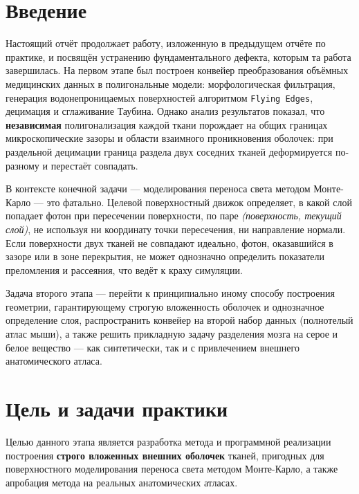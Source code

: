 \documentclass[a4paper,14pt]{article}
\begin{document}

\newpage

\tableofcontents
\newpage

\section{Введение}
Настоящий отчёт продолжает работу, изложенную в предыдущем отчёте по практике, и посвящён устранению фундаментального дефекта, которым та работа завершилась. На первом этапе был построен конвейер преобразования объёмных медицинских данных в полигональные модели: морфологическая фильтрация, генерация водонепроницаемых поверхностей алгоритмом \texttt{Flying Edges}, децимация и сглаживание Таубина. Однако анализ результатов показал, что \textbf{независимая} полигонализация каждой ткани порождает на общих границах микроскопические зазоры и области взаимного проникновения оболочек: при раздельной децимации граница раздела двух соседних тканей деформируется по-разному и перестаёт совпадать.

В контексте конечной задачи --- моделирования переноса света методом Монте-Карло \cite{wang1995} --- это фатально. Целевой поверхностный движок определяет, в какой слой попадает фотон при пересечении поверхности, по паре \emph{(поверхность, текущий слой)}, не используя ни координату точки пересечения, ни направление нормали. Если поверхности двух тканей не совпадают идеально, фотон, оказавшийся в зазоре или в зоне перекрытия, не может однозначно определить показатели преломления и рассеяния, что ведёт к краху симуляции.

Задача второго этапа --- перейти к принципиально иному способу построения геометрии, гарантирующему строгую вложенность оболочек и однозначное определение слоя, распространить конвейер на второй набор данных (полнотелый атлас мыши), а также решить прикладную задачу разделения мозга на серое и белое вещество --- как синтетически, так и с привлечением внешнего анатомического атласа.

\newpage
\section{Цель и задачи практики}
Целью данного этапа является разработка метода и программной реализации построения \textbf{строго вложенных внешних оболочек} тканей, пригодных для поверхностного моделирования переноса света методом Монте-Карло, а также апробация метода на реальных анатомических атласах.
\end{document}
